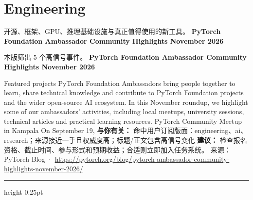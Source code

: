 \documentclass[10.5pt]{ctexart}
\begin{document}
\section*{Engineering}
{\color{ormuted} 开源、框架、GPU、推理基础设施与真正值得使用的新工具。}
\vspace{2mm}
{\LARGE\bfseries PyTorch Foundation Ambassador Community Highlights November 2026}\par
\vspace{1mm}
{\color{ormuted} 本版筛出 5 个高信号事件。}
\vspace{3mm}
{\Large\bfseries PyTorch Foundation Ambassador Community Highlights November 2026}\par
Featured projects PyTorch Foundation Ambassadors bring people together to learn, share technical knowledge and contribute to PyTorch Foundation projects and the wider open-source AI ecosystem. In this November roundup, we highlight some of our ambassadors’ activities, including local meetups, university sessions, technical articles and practical learning resources. PyTorch Community Meetup in Kampala On September 19,
\textbf{与你有关：} 命中用户订阅版面：engineering、ai、research；来源接近一手且权威度高；标题/正文包含高信号变化
\textbf{建议：} 检查报名资格、截止时间、参与形式和预期收益；合适则立即加入任务系统。
{\footnotesize\color{ormuted} 来源：PyTorch Blog · \url{https://pytorch.org/blog/pytorch-ambassador-community-highlights-november-2026/}}
\vspace{4mm}
\hrule height 0.25pt
\vspace{3mm}
\end{document}
